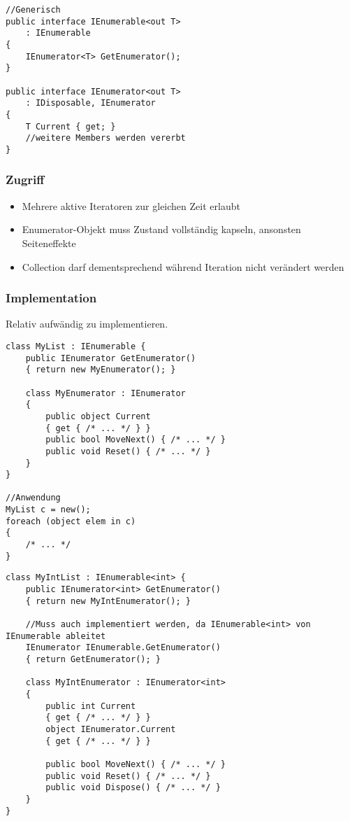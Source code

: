 \begin{multicols*}{2}
\begin{lstlisting}
//Generisch
public interface IEnumerable<out T>
    : IEnumerable
{
    IEnumerator<T> GetEnumerator();
}

public interface IEnumerator<out T> 
    : IDisposable, IEnumerator
{
    T Current { get; }
    //weitere Members werden vererbt
}
\end{lstlisting}
\subsubsection{Zugriff}
\begin{itemize}
    \item Mehrere aktive Iteratoren zur gleichen Zeit erlaubt
    \item Enumerator-Objekt muss Zustand vollständig kapseln, ansonsten Seiteneffekte
    \item Collection darf dementsprechend während Iteration nicht verändert werden
\end{itemize}
\subsubsection{Implementation}
Relativ aufwändig zu implementieren.
\begin{lstlisting}
class MyList : IEnumerable {
    public IEnumerator GetEnumerator()
    { return new MyEnumerator(); }

    class MyEnumerator : IEnumerator
    {
        public object Current
        { get { /* ... */ } }
        public bool MoveNext() { /* ... */ }
        public void Reset() { /* ... */ }
    }
}   

//Anwendung
MyList c = new();
foreach (object elem in c)
{
    /* ... */
}
\end{lstlisting}
\begin{lstlisting}
class MyIntList : IEnumerable<int> {
    public IEnumerator<int> GetEnumerator()
    { return new MyIntEnumerator(); }
    
    //Muss auch implementiert werden, da IEnumerable<int> von IEnumerable ableitet
    IEnumerator IEnumerable.GetEnumerator() 
    { return GetEnumerator(); }
    
    class MyIntEnumerator : IEnumerator<int>
    {   
        public int Current
        { get { /* ... */ } }
        object IEnumerator.Current
        { get { /* ... */ } }

        public bool MoveNext() { /* ... */ }
        public void Reset() { /* ... */ }
        public void Dispose() { /* ... */ }
    } 
}


\end{lstlisting}
\end{multicols*}

